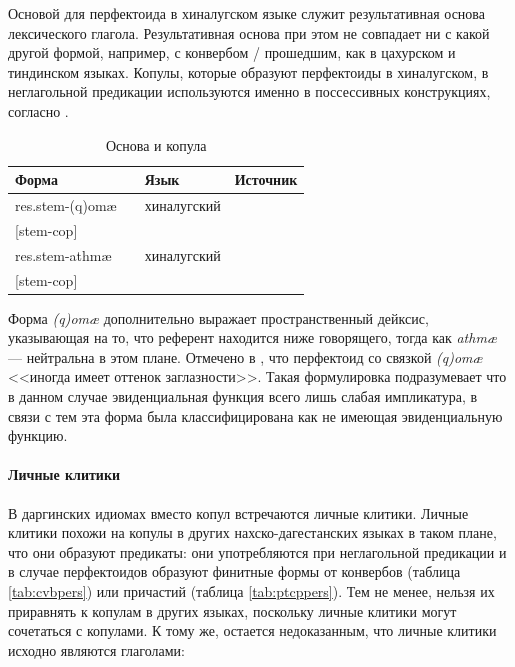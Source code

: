 Основой для перфектоида в хиналугском языке служит результативная основа лексического глагола. Результативная основа при этом не совпадает ни с какой другой формой, например, с конвербом / прошедшим, как в цахурском и тиндинском языках. Копулы, которые образуют перфектоиды в хиналугском, в неглагольной предикации используются именно в поссессивных конструкциях, согласно \citep[162--164]{kibriketal1972}. 

\begin{table}[H]
\caption{Основа и копула}
\label{tab:stemcop}
\vspace{0.2cm}
\begin{center}
\begin{tabular}{ll|ll}
\multicolumn{2}{l|}{Форма} & Язык      & Источник   \\ \hline
res.stem-(q)omæ	&		&	хиналугский	&	\citep{kibriketal1972}	\\
{[}stem-cop{]}	&		&		&		\\
res.stem-athmæ	&		&	хиналугский	&	\citep{kibriketal1972}	\\
{[}stem-cop{]}	&		&		&		\\
\end{tabular}
\end{center}
\end{table}

Форма  \textit{(q)omæ} дополнительно выражает пространственный дейксис, указывающая на то, что референт находится ниже говорящего, тогда как \textit{athmæ} --- нейтральна в этом плане. Отмечено в \citep[178]{kibriketal1972}, что перфектоид со связкой \textit{(q)omæ} <<иногда имеет оттенок заглазности>>. Такая формулировка подразумевает что в данном случае эвиденциальная функция всего лишь слабая импликатура, в связи с тем эта форма была классифицирована как не имеющая эвиденциальную функцию.

\paragraph{Личные клитики} \label{sec:pfpers}

В даргинских идиомах вместо копул встречаются личные клитики. Личные клитики похожи на копулы в других нахско-дагестанских языках в таком плане, что они образуют предикаты: они употребляются при неглагольной предикации и в случае перфектоидов образуют финитные формы от конвербов (таблица \ref{tab:cvbpers}) или причастий (таблица \ref{tab:ptcppers}). Тем не менее, нельзя их приравнять к копулам в других языках, поскольку личные клитики могут сочетаться с копулами. К тому же, остается недоказанным, что личные клитики исходно являются глаголами:

